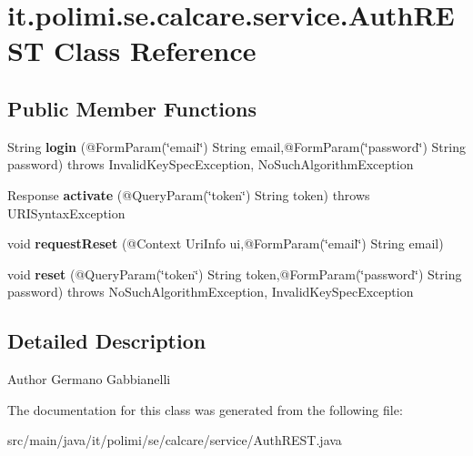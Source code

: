 \hypertarget{classit_1_1polimi_1_1se_1_1calcare_1_1service_1_1AuthREST}{}\section{it.\+polimi.\+se.\+calcare.\+service.\+Auth\+R\+E\+S\+T Class Reference}
\label{classit_1_1polimi_1_1se_1_1calcare_1_1service_1_1AuthREST}
\subsection*{Public Member Functions}
\begin{DoxyCompactItemize}
\item 
\hypertarget{classit_1_1polimi_1_1se_1_1calcare_1_1service_1_1AuthREST_a36709d01a316a13d00e992883e990c3d}{}String {\bfseries login} (@Form\+Param(\char`\"{}email\char`\"{}) String email,@Form\+Param(\char`\"{}password\char`\"{}) String password)  throws Invalid\+Key\+Spec\+Exception, No\+Such\+Algorithm\+Exception \label{classit_1_1polimi_1_1se_1_1calcare_1_1service_1_1AuthREST_a36709d01a316a13d00e992883e990c3d}

\item 
\hypertarget{classit_1_1polimi_1_1se_1_1calcare_1_1service_1_1AuthREST_a05920ad51ca1056ea0784f2406a53391}{}Response {\bfseries activate} (@Query\+Param(\char`\"{}token\char`\"{}) String token)  throws U\+R\+I\+Syntax\+Exception \label{classit_1_1polimi_1_1se_1_1calcare_1_1service_1_1AuthREST_a05920ad51ca1056ea0784f2406a53391}

\item 
\hypertarget{classit_1_1polimi_1_1se_1_1calcare_1_1service_1_1AuthREST_a0f04c50820dc3f1ecdddc9ca1d452b0d}{}void {\bfseries request\+Reset} (@Context Uri\+Info ui,@Form\+Param(\char`\"{}email\char`\"{}) String email)\label{classit_1_1polimi_1_1se_1_1calcare_1_1service_1_1AuthREST_a0f04c50820dc3f1ecdddc9ca1d452b0d}

\item 
\hypertarget{classit_1_1polimi_1_1se_1_1calcare_1_1service_1_1AuthREST_a794517d0b58b85de51c18ce17f44f9bd}{}void {\bfseries reset} (@Query\+Param(\char`\"{}token\char`\"{}) String token,@Form\+Param(\char`\"{}password\char`\"{}) String password)  throws No\+Such\+Algorithm\+Exception, Invalid\+Key\+Spec\+Exception \label{classit_1_1polimi_1_1se_1_1calcare_1_1service_1_1AuthREST_a794517d0b58b85de51c18ce17f44f9bd}

\end{DoxyCompactItemize}


\subsection{Detailed Description}
\begin{DoxyAuthor}{Author}
Germano Gabbianelli 
\end{DoxyAuthor}


The documentation for this class was generated from the following file\+:\begin{DoxyCompactItemize}
\item 
src/main/java/it/polimi/se/calcare/service/Auth\+R\+E\+S\+T.\+java\end{DoxyCompactItemize}
